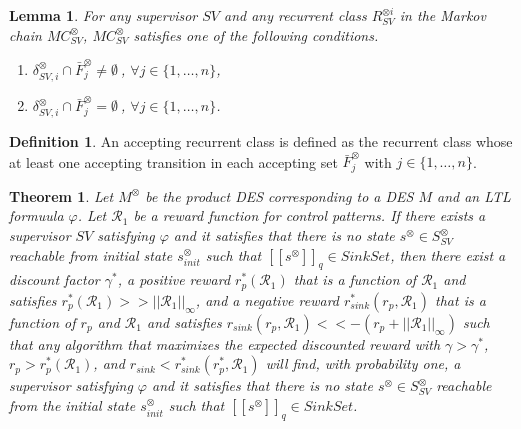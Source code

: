 \documentclass[10pt]{article}
\newtheorem{theorem}{Theorem}
\newtheorem{lemma}{Lemma}
\theoremstyle{definition}
\newtheorem{definition}{Definition}
\newcommand{\myspq}{\ensuremath{[\![s^{\otimes}]\!]}_q}
\begin{document}
\begin{lemma}
  For any supervisor $SV$ and any recurrent class $R^{\otimes i}_{SV}$ in the Markov chain $MC^{\otimes}_{SV}$,
  $MC^{\otimes}_{SV}$ satisfies one of the following conditions.
  \vspace{2mm}
  \begin{enumerate}
    \item $\delta^{\otimes}_{SV,i} \cap \bar{F}^{\otimes}_j \neq \emptyset\ $, $ \forall j \in \{ 1, \ldots ,n \}$,
    \item $\delta^{\otimes}_{SV,i} \cap \bar{F}^{\otimes}_j = \emptyset\ $, $ \forall j \in \{ 1, \ldots ,n \}$.
  \end{enumerate}
  \label{lemma3-1}
\end{lemma}

\begin{definition}
  An accepting recurrent class is defined as the recurrent class whose at least one accepting transition in each accepting set $\bar{F}^{\otimes}_j$ with $j \in \{ 1, \ldots, n \}$.
\end{definition}

\begin{theorem}
  Let $M^{\otimes}$ be the product DES corresponding to a DES $M$ and an LTL formuula $\varphi$. Let $\mathcal{R}_1$ be a reward function for control patterns. %
  If there exists a supervisor $SV$ satisfying $\varphi$ and it satisfies that there is no state $s^{\otimes} \in S^{\otimes}_{SV}$ reachable from initial state $s^{\otimes}_{init}$ such that $\myspq \in SinkSet$, then there exist a discount factor $\gamma^{\ast}$, a positive reward $r^{\ast}_p(\mathcal{R}_1)$ that is a function of $\mathcal{R}_1$ and satisfies $ r^{\ast}_p(\mathcal{R}_1) >> ||\mathcal{R}_1||_{\infty}$, and a negative reward $r^{\ast}_{sink}(r_p, \mathcal{R}_1)$ that is a function of $r_p$ and $\mathcal{R}_1$ and satisfies $r_{sink}(r_p, \mathcal{R}_1) << - (r_p + ||\mathcal{R}_1||_{\infty}) $ such that any algorithm that maximizes the expected discounted reward with $\gamma > \gamma^{\ast}$, $r_p > r^{\ast}_p(\mathcal{R}_1)$, and $r_{sink} < r^{\ast}_{sink}(r^{\ast}_p, \mathcal{R}_1)$ will find, with probability one, a supervisor satisfying $\varphi$ and it satisfies that there is no state $s^{\otimes} \in S^{\otimes}_{SV}$ reachable from the initial state $s^{\otimes}_{init}$ such that $\myspq \in SinkSet$.
\end{theorem}
\end{document}
